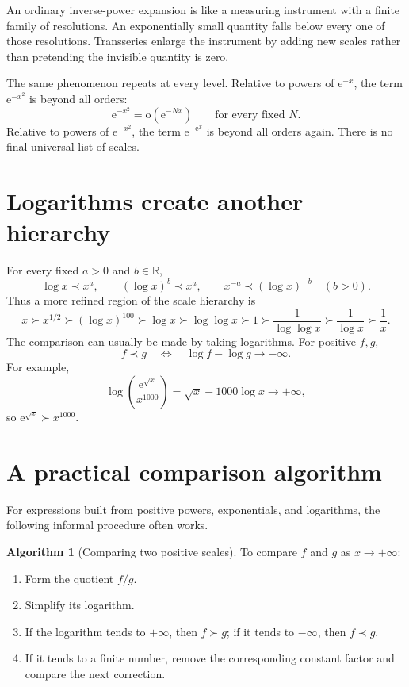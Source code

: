 \documentclass[11pt,openany]{book}
\theoremstyle{definition}
\newtheorem{algorithm}{Algorithm}[chapter]
\theoremstyle{plain}
\theoremstyle{remark}
\newcommand{\R}{\mathbb{R}}
\newcommand{\e}{\mathrm{e}}
\newcommand{\smallo}{\mathrm{o}}
\newcommand{\precdom}{\prec}
\newcommand{\succdom}{\succ}
\begin{document}
\begin{intuitionbox}
An ordinary inverse-power expansion is like a measuring instrument with a finite family of resolutions. An exponentially small quantity falls below every one of those resolutions. Transseries enlarge the instrument by adding new scales rather than pretending the invisible quantity is zero.
\end{intuitionbox}

The same phenomenon repeats at every level. Relative to powers of $\e^{-x}$, the term $\e^{-x^2}$ is beyond all orders:
\[
 \e^{-x^2}=\smallo(\e^{-Nx})
 \qquad\text{for every fixed }N.
\]
Relative to powers of $\e^{-x^2}$, the term $\e^{-\e^x}$ is beyond all orders again. There is no final universal list of scales.

\section{Logarithms create another hierarchy}

For every fixed $a>0$ and $b\in\R$,
\[
 \log x\precdom x^a,
 \qquad
 (\log x)^b\precdom x^a,
 \qquad
 x^{-a}\precdom(\log x)^{-b}\quad(b>0).
\]
Thus a more refined region of the scale hierarchy is
\[
 x\succdom x^{1/2}\succdom (\log x)^{100}
 \succdom\log x\succdom\log\log x\succdom1
 \succdom\frac1{\log\log x}\succdom\frac1{\log x}
 \succdom\frac1x.
\]
The comparison can usually be made by taking logarithms. For positive $f,g$,
\[
 f\precdom g
 \quad\Longleftrightarrow\quad
 \log f-\log g\longrightarrow-\infty.
\]
For example,
\[
 \log\left(\frac{\e^{\sqrt{x}}}{x^{1000}}\right)
 =\sqrt{x}-1000\log x\longrightarrow+\infty,
\]
so $\e^{\sqrt{x}}\succdom x^{1000}$.

\section{A practical comparison algorithm}

For expressions built from positive powers, exponentials, and logarithms, the following informal procedure often works.

\begin{algorithm}[Comparing two positive scales]
To compare $f$ and $g$ as $x\to+\infty$:
\begin{enumerate}
\item Form the quotient $f/g$.
\item Simplify its logarithm.
\item If the logarithm tends to $+\infty$, then $f\succdom g$; if it tends to $-\infty$, then $f\precdom g$.
\item If it tends to a finite number, remove the corresponding constant factor and compare the next correction.
\end{enumerate}
\end{algorithm}
\end{document}
